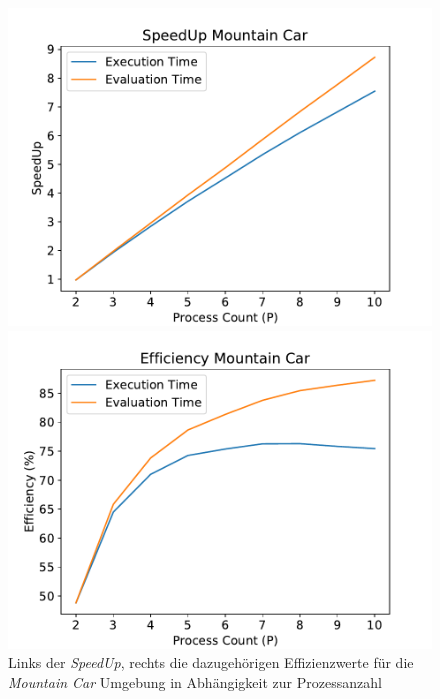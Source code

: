 \begin{figure}[!h]
	\centering
	\begin{minipage}[]{0.49\textwidth}
		\includegraphics[width=1.0\textwidth]{./img/mountain_car_analysis/mountain_car_speedup_2_10.pdf} 
	\end{minipage}
	\hfill
	\begin{minipage}[]{0.49\textwidth}
		\includegraphics[width=1.0\textwidth]{./img/mountain_car_analysis/efficecny mountain_car_2_10.pdf} 
	\end{minipage}
	\caption{Links der \emph{SpeedUp}, rechts die dazugehörigen Effizienzwerte für die \emph{Mountain Car} Umgebung in Abhängigkeit zur Prozessanzahl}
	\label{fig:mountain_car_2_10_efficiency_speedup}
\end{figure}
